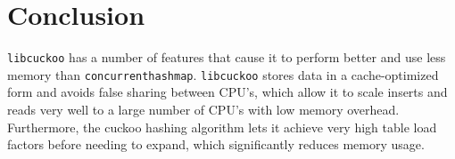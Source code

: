 \documentclass{article}
\newcommand{\tbbmap}{\texttt{concurrent\textunderscore hash\textunderscore map}}
\newcommand{\libcuckoo}{\texttt{libcuckoo}}
\begin{document}
\section*{Conclusion}

{\libcuckoo} has a number of features that cause it to perform better and use
less memory than {\tbbmap}. {\libcuckoo} stores data in a cache-optimized form
and avoids false sharing between CPU's, which allow it to scale inserts and
reads very well to a large number of CPU's with low memory overhead.
Furthermore, the cuckoo hashing algorithm lets it achieve very high table load
factors before needing to expand, which significantly reduces memory usage.
\end{document}
